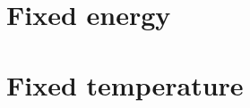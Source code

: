 \documentclass[11pt,a4paper]{article}
\begin{document}
\section{Fixed energy}



\FloatBarrier

\section{Fixed temperature}





\end{document}
